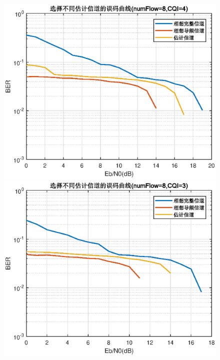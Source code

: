 \documentclass{article}
\begin{document}
\begin{figure}[htbp]
	\centering
	\begin{minipage}[t]{0.48\textwidth}
	\centering
	\includegraphics[width=\textwidth]{plot/plot_CQI4.eps}
	\end{minipage}
	\begin{minipage}[t]{0.48\textwidth}
	\centering
	\includegraphics[width=\textwidth]{plot/plot_CQI3.eps}
	\end{minipage}
\end{figure}
\end{document}
